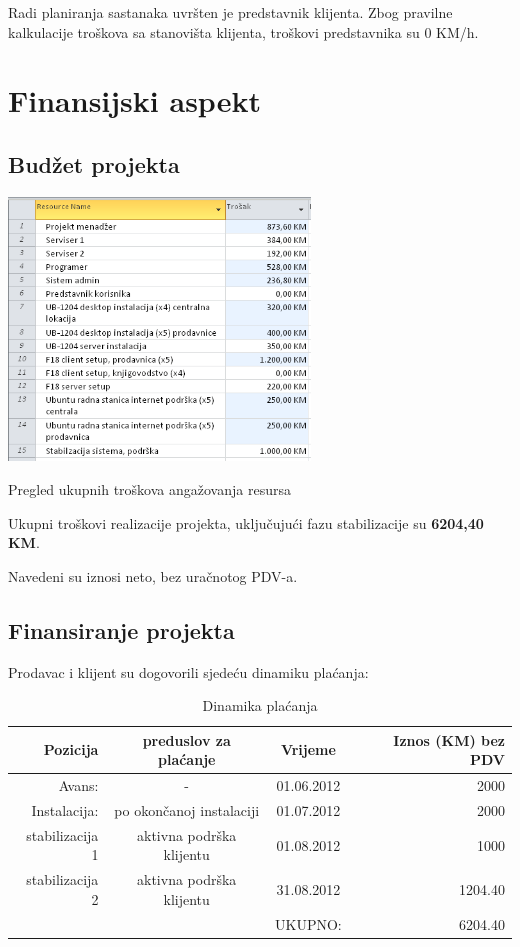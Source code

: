 \documentclass[times, utf8, seminar]{fit}
\begin{document}
Radi planiranja sastanaka uvršten je predstavnik klijenta. Zbog pravilne kalkulacije troškova sa stanovišta klijenta, troškovi predstavnika su 0 KM/h.

\pagebreak
\section{Finansijski aspekt}
\subsection{Budžet projekta}
\begin{table}[!h]
\centering
\includegraphics[height=7cm]{img/troskovi.png}
\caption{Pregled ukupnih troškova angažovanja resursa}
\end{table}

Ukupni troškovi realizacije projekta, uključujući fazu stabilizacije su \textbf{6204,40 KM}.

Navedeni su iznosi neto, bez uračnotog PDV-a.

\subsection{Finansiranje projekta}

Prodavac i klijent su dogovorili sjedeću dinamiku plaćanja:

\begin{table}[h]
\centering
\resizebox{15cm}{!} {
\begin{tabular}{ | r | c | c | r | }
\hline
Pozicija & preduslov za plaćanje & Vrijeme & Iznos (KM) bez PDV \\ \hline\hline
Avans: & - & 01.06.2012 & 2000 \\ \hline
Instalacija: & po okončanoj instalaciji & 01.07.2012 & 2000 \\ \hline
stabilizacija 1 & aktivna podrška klijentu & 01.08.2012 & 1000 \\ \hline 
stabilizacija 2 & aktivna podrška klijentu & 31.08.2012 & 1204.40 \\ \hline\hline 
                &                          &    UKUPNO: & 6204.40 \\ \hline
\end{tabular}
}
\caption{Dinamika plaćanja}
\end{table}
\end{document}
